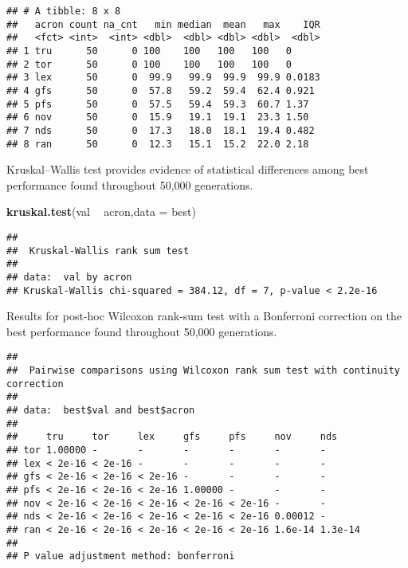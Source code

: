 \documentclass[]{book}
\newenvironment{Shaded}{\begin{snugshade}}{\end{snugshade}}
\newcommand{\DataTypeTok}[1]{\textcolor[rgb]{0.13,0.29,0.53}{#1}}
\newcommand{\KeywordTok}[1]{\textcolor[rgb]{0.13,0.29,0.53}{\textbf{#1}}}
\newcommand{\NormalTok}[1]{#1}
\newcommand{\OperatorTok}[1]{\textcolor[rgb]{0.81,0.36,0.00}{\textbf{#1}}}
\newcommand{\OtherTok}[1]{\textcolor[rgb]{0.56,0.35,0.01}{#1}}
\newcommand{\StringTok}[1]{\textcolor[rgb]{0.31,0.60,0.02}{#1}}
\begin{document}
\begin{verbatim}
## # A tibble: 8 x 8
##   acron count na_cnt   min median  mean   max    IQR
##   <fct> <int>  <int> <dbl>  <dbl> <dbl> <dbl>  <dbl>
## 1 tru      50      0 100    100   100   100   0     
## 2 tor      50      0 100    100   100   100   0     
## 3 lex      50      0  99.9   99.9  99.9  99.9 0.0183
## 4 gfs      50      0  57.8   59.2  59.4  62.4 0.921 
## 5 pfs      50      0  57.5   59.4  59.3  60.7 1.37  
## 6 nov      50      0  15.9   19.1  19.1  23.3 1.50  
## 7 nds      50      0  17.3   18.0  18.1  19.4 0.482 
## 8 ran      50      0  12.3   15.1  15.2  22.0 2.18
\end{verbatim}

Kruskal--Wallis test provides evidence of statistical differences among best performance found throughout 50,000 generations.

\begin{Shaded}
\begin{Highlighting}[]
\KeywordTok{kruskal.test}\NormalTok{(val }\OperatorTok{~}\StringTok{ }\NormalTok{acron,}\DataTypeTok{data =}\NormalTok{ best)}
\end{Highlighting}
\end{Shaded}

\begin{verbatim}
## 
##  Kruskal-Wallis rank sum test
## 
## data:  val by acron
## Kruskal-Wallis chi-squared = 384.12, df = 7, p-value < 2.2e-16
\end{verbatim}

Results for post-hoc Wilcoxon rank-sum test with a Bonferroni correction on the best performance found throughout 50,000 generations.

\begin{Shaded}
\end{Shaded}

\begin{verbatim}
## 
##  Pairwise comparisons using Wilcoxon rank sum test with continuity correction 
## 
## data:  best$val and best$acron 
## 
##     tru     tor     lex     gfs     pfs     nov     nds    
## tor 1.00000 -       -       -       -       -       -      
## lex < 2e-16 < 2e-16 -       -       -       -       -      
## gfs < 2e-16 < 2e-16 < 2e-16 -       -       -       -      
## pfs < 2e-16 < 2e-16 < 2e-16 1.00000 -       -       -      
## nov < 2e-16 < 2e-16 < 2e-16 < 2e-16 < 2e-16 -       -      
## nds < 2e-16 < 2e-16 < 2e-16 < 2e-16 < 2e-16 0.00012 -      
## ran < 2e-16 < 2e-16 < 2e-16 < 2e-16 < 2e-16 1.6e-14 1.3e-14
## 
## P value adjustment method: bonferroni
\end{verbatim}
\end{document}
